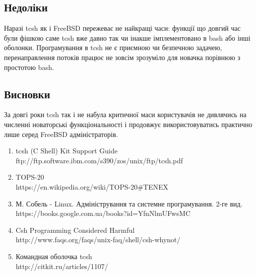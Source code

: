   \subsection{Недоліки}
  Наразі tcsh як і FreeBSD пережеває не найкращі часи: функції що довгий час були фішкою саме tcsh вже давно так чи інакше імплементовано в bash або інші оболонки. Програмування в tcsh не є приємною чи безпечною задачею, перенаправлення потоків працює не зовсім зрозуміло для новачка порівнюю з простотою bash.

  \subsection{Висновки}
  За довгі роки tcsh так і не набула критичної маси користувачів не дивлячись на численні новаторські функціональності і продовжує використовуватись практично лише серед FreeBSD адміністраторів.

\begin{left}\small{}\end{left}
\begin{enumerate}
  \item tcsh (C Shell) Kit Support Guide \\ ftp://ftp.software.ibm.com/s390/zos/unix/ftp/tcsh.pdf
  \item TOPS-20 \\ https://en.wikipedia.org/wiki/TOPS-20#TENEX
  \item М. Собель - Linux. Адміністрування та системне програмування. 2-ге вид. \\
  https://books.google.com.ua/books?id=YfnNlmUFwsMC
  \item Csh Programming Considered Harmful \\
http://www.faqs.org/faqs/unix-faq/shell/csh-whynot/
  \item Командная оболочка tcsh \\ http://citkit.ru/articles/1107/
\end{enumerate}
